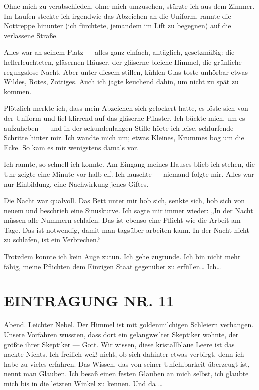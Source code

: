 Ohne mich zu verabschieden, ohne mich umzusehen, stürzte ich aus
dem Zimmer. Im Laufen steckte ich irgendwie das Abzeichen an die
Uniform, rannte die Nottreppe hinunter (ich fürchtete, jemandem im
Lift zu begegnen) auf die verlassene Straße.

Alles war an seinem Platz — alles ganz einfach, alltäglich,
gesetzmäßig: die hellerleuchteten, gläsernen Häuser, der gläserne
bleiche Himmel, die grünliche regungslose Nacht. Aber unter diesem
stillen, kühlen Glas toste unhörbar etwas Wildes, Rotes, Zottiges.
Auch ich jagte keuchend dahin, um nicht zu spät zu kommen.

Plötzlich merkte ich, dass mein Abzeichen sich gelockert hatte, es
löste sich von der Uniform und fiel klirrend auf das gläserne
Pflaster. Ich bückte mich, um es aufzuheben — und in der
sekundenlangen Stille hörte ich leise, schlurfende Schritte hinter
mir. Ich wandte mich um; etwas Kleines, Krummes bog um die Ecke. So
kam es mir wenigstens damals vor.

Ich rannte, so schnell ich konnte. Am Eingang meines Hauses blieb
ich stehen, die Uhr zeigte eine Minute vor halb elf. Ich lauschte —
niemand folgte mir. Alles war nur Einbildung, eine Nachwirkung
jenes Giftes.

Die Nacht war qualvoll. Das Bett unter mir hob sich,
senkte sich, hob sich von neuem und beschrieb eine Sinuskurve.
Ich sagte mir immer wieder: „In der Nacht müssen alle
Nummern schlafen. Das ist ebenso eine Pflicht wie die Arbeit am
Tage. Das ist notwendig, damit man tagsüber arbeiten kann. In der
Nacht nicht zu schlafen, ist ein Verbrechen.“

Trotzdem konnte ich kein Auge zutun. Ich gehe zugrunde. Ich bin
nicht mehr fähig, meine Pflichten dem Einzigen Staat gegenüber zu
erfüllen\ldots{} Ich\ldots{}

\section{EINTRAGUNG NR. 11}

Abend. Leichter Nebel. Der Himmel ist mit goldenmilchigen Schleiern
verhangen. Unsere Vorfahren wussten, dass dort ein gelangweilter
Skeptiker wohnte, der größte ihrer Skeptiker — Gott. Wir wissen,
diese kristallblaue Leere ist das nackte Nichts. Ich freilich weiß
nicht, ob sich dahinter etwas verbirgt, denn ich habe zu vieles
erfahren. Das Wissen, das von seiner Unfehlbarkeit überzeugt ist,
nennt man Glauben. Ich besaß einen festen Glauben an mich selbst,
ich glaubte mich bis in die letzten Winkel zu kennen. Und da \ldots{}

